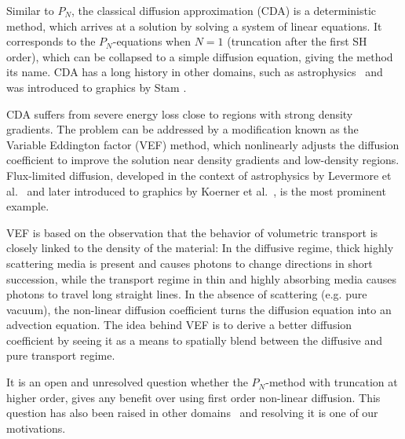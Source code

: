 Similar to $P_N$, the classical diffusion approximation (CDA) is a deterministic method, which arrives at a solution by solving a system of linear equations. It corresponds to the $P_N$-equations when $N=1$ (truncation after the first SH order), which can be collapsed to a simple diffusion equation, giving the method its name. CDA has a long history in other domains, such as astrophysics~\cite{Ishimaru78} and was introduced to graphics by Stam \cite{Stam95}.

CDA suffers from severe energy loss close to regions with strong density gradients. The problem can be addressed by a modification known as the Variable Eddington factor (VEF) method, which nonlinearly adjusts the diffusion coefficient to improve the solution near density gradients and low-density regions. Flux-limited diffusion, developed in the context of astrophysics by Levermore et al.~\cite{Levermore81} and later introduced to graphics by Koerner et al.~\cite{Koerner14}, is the most prominent example.

VEF is based on the observation that the behavior of volumetric transport is closely linked to the density of the material: In the diffusive regime, thick highly scattering media is present and causes photons to change directions in short succession, while the transport regime in thin and highly absorbing media causes photons to travel long straight lines. In the absence of scattering (e.g. pure vacuum), the non-linear diffusion coefficient turns the diffusion equation into an advection equation. The idea behind VEF is to derive a better diffusion coefficient by seeing it as a means to spatially blend between the diffusive and pure transport regime.

It is an open and unresolved question whether the $P_N$-method with truncation at higher order, gives any benefit over using first order non-linear diffusion. This question has also been raised in other domains~\cite{Olson00} and resolving it is one of our motivations.

\vspace{1in}





